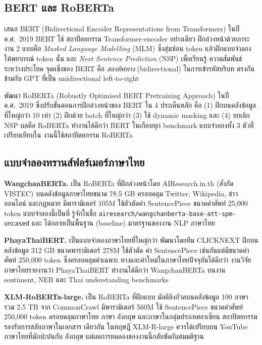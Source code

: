 \subsection{BERT และ RoBERTa}

\textbf{\textcite{devlin2019bert}} เสนอ BERT (Bidirectional
Encoder Representations from Transformers) ในปี ค.ศ.\ 2019 BERT ใช้
สถาปัตยกรรม Transformer-encoder อย่างเดียว ฝึกล่วงหน้าด้วยภาระงาน 2 แบบคือ
\emph{Masked Language Modelling} (MLM) ซึ่งสุ่มซ่อน token แล้วฝึกแบบจำลอง
ให้พยากรณ์ token นั้น และ \emph{Next Sentence Prediction} (NSP) เพื่อเรียนรู้
ความสัมพันธ์ระหว่างประโยค จุดแข็งของ BERT คือ \emph{สองทิศทาง}
(bidirectional) ในการเข้ารหัสบริบท ตรงกันข้ามกับ GPT ที่เป็น unidirectional
left-to-right

\textbf{\textcite{liu2019roberta}} พัฒนา RoBERTa (Robustly Optimised
BERT Pretraining Approach) ในปี ค.ศ.\ 2019 ซึ่งปรับขั้นตอนการฝึกล่วงหน้าของ
BERT ใน 4 ประเด็นหลัก คือ (1) ฝึกบนคลังข้อมูลที่ใหญ่กว่า 10 เท่า (2) ฝึกด้วย
batch ที่ใหญ่กว่า (3) ใช้ dynamic masking และ (4) ยกเลิก NSP ผลคือ RoBERTa
ทำงานได้ดีกว่า BERT ในเกือบทุก benchmark แบบจำลองทั้ง 3 ตัวที่เปรียบเทียบใน
งานนี้ใช้สถาปัตยกรรม RoBERTa

\subsection{แบบจำลองทรานส์ฟอร์เมอร์ภาษาไทย}
\label{sec:lit-thai-tx}

\textbf{WangchanBERTa.} \cite{lowphansirikul2021wangchanberta} เป็น RoBERTa
ที่ฝึกล่วงหน้าโดย AIResearch.in.th (สังกัด VISTEC) บนคลังข้อมูลภาษาไทยขนาด
78.5 GB ครอบคลุม Twitter, Wikipedia, ข่าวออนไลน์ และกฎหมาย มีพารามิเตอร์
105M ใช้ตัวตัดคำ SentencePiece ขนาดคำศัพท์ 25{,}000 token แบบจำลองนี้เป็นที่
รู้จักในชื่อ \texttt{airesearch/wangchanberta-base-att-spm-uncased} และ
ได้กลายเป็นพื้นฐาน (baseline) มาตรฐานของงาน NLP ภาษาไทย

\textbf{PhayaThaiBERT.} \cite{phayathaibert2023} เป็นแบบจำลองภาษาไทยที่ใหญ่กว่า
พัฒนาโดยทีม CLICKNEXT ฝึกบนคลังข้อมูล 312 GB ขนาดพารามิเตอร์ 278M ใช้ตัวตัด
คำ SentencePiece เช่นกันแต่มีขนาดคำศัพท์ 250{,}000 token ซึ่งครอบคลุมคำเฉพาะ
ทางและคำใหม่ในภาษาไทยปัจจุบันได้ดีกว่า งานวิจัยภาษาไทยรายงานว่า PhayaThaiBERT
ทำงานได้ดีกว่า WangchanBERTa บนงาน sentiment, NER และ Thai understanding
benchmarks

\textbf{XLM-RoBERTa-large.} \cite{conneau2020xlmr} เป็น RoBERTa ที่ฝึกแบบ
มัลติลิงกัวลบนคลังข้อมูล 100 ภาษา รวม 2.5 TB จาก CommonCrawl มีพารามิเตอร์
560M ใช้ SentencePiece ขนาดคำศัพท์ 250{,}000 token ครอบคลุมภาษาไทย ภาษา
อังกฤษ และภาษาในกลุ่มประเทศอาเซียน สถาปัตยกรรมรองรับการสลับภาษาในเอกสาร
เดียวกัน ในทฤษฎี XLM-R-large ควรได้เปรียบบน YouTube ภาษาไทยที่มักปะปนกับ
อังกฤษ แต่ผลการทดลองของงานนี้กลับขัดกับสมมติฐาน

